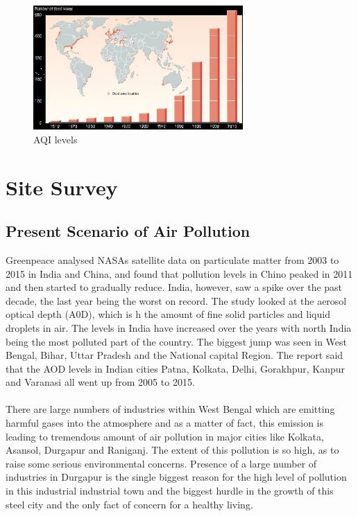 \begin{figure}[h]
\centering
  \includegraphics[width=80mm]{deadzone.jpg}
  \caption{AQI levels}
  \label{fig:AQI levels}
\end{figure}


\section{Site Survey}

\subsection{Present Scenario of Air Pollution}
Greenpeace analysed NASAs satellite data on particulate matter from 2003 to 2015 in India and China, and found that pollution levels in Chino peaked in 2011 and then started to gradually reduce. India, however, saw a spike over the past decade, the last year being the worst on record. The study looked at the aerosol optical depth (A0D), which is h the amount of fine solid particles and liquid droplets in air. The levels in India have increased over the years with north India being the most polluted part of the country. The biggest jump was seen in West Bengal, Bihar, Uttar Pradesh and the National capital Region. The report said that the AOD levels in Indian cities Patna, Kolkata, Delhi, Gorakhpur, Kanpur and Varanasi all went up from 2005 to 2015.
\\
\\
There are large numbers of industries within West Bengal which are emitting harmful gases into the atmosphere and as a matter of fact, this emission is leading to tremendous amount of air pollution in major cities like Kolkata, Asansol, Durgapur and Raniganj. The extent of this pollution is so high, as to raise some serious environmental concerns. Presence of a large number of industries in Durgapur is the single biggest reason for the high level of pollution in this industrial industrial town and the biggest hurdle in the growth of this steel city and the only fact of concern for a healthy living.\cite{11}

